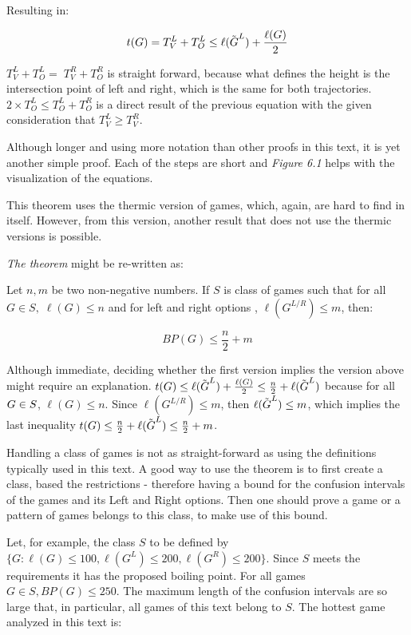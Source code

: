 Resulting in:

$$
t(G) = T^L_V + T^L_O \leq \ell(\tilde{\mbox{$G$}}^L) + \frac{\ell(G)}{2}
$$

$T^L_V + T^L_O =\;T^R_V+T^R_O$ is straight forward, because what defines the height is the intersection point of left and right, which is the same for both trajectories. $2\times T^L_O \leq T^L_O + T^R_O$ is a direct result of the previous equation with the given consideration that $T^L_V \ge T^R_V$. 

Although longer and using more notation than other proofs in this text, it is yet another simple proof. Each of the steps are short and \textit{Figure 6.1} helps with the visualization of the equations.

This theorem uses the thermic version of games, which, again, are hard to find in itself. However, from this version, another result that does not use the thermic versions is possible.

\textit{The theorem} might be re-written as:

Let $n, m$ be two non-negative numbers. If $S$ is class of games such that for all $G \in S,\;\ell(G) \leq n$ and for left and right options , $\ell(G^{L/R}) \leq m$, then:

$$
BP(G) \leq \frac{n}{2} + m
$$

Although immediate, deciding whether the first version implies the version above might require an explanation. $t(G) \leq \ell(\tilde{\mbox{$G$}}^L) + \frac{\ell(G)}{2} \leq \frac{n}{2} + \ell(\tilde{\mbox{$G$}}^L)$ because for all \mbox{$\mbox{$G$} \in S$}, \mbox{$\ell(G) \leq n$}. Since $\ell(G^{L/R}) \leq m$, then $\ell(\tilde{\mbox{$G$}}^L) \leq m$, which implies the last inequality \mbox{$t(G) \leq \frac{n}{2} + \ell(\tilde{\mbox{$G$}}^L) \leq \frac{n}{2} + m$}.

Handling a class of games is not as straight-forward as using the definitions typically used in this text. A good way to use the theorem is to first create a class, based the restrictions - therefore having a bound for the confusion intervals of the games and its Left and Right options. Then one should prove a game or a pattern of games belongs to this class, to make use of this bound.

Let, for example, the class $S$ to be defined by $\{G : \ell(G)\leq100, \ell(G^L)\leq200, \ell(G^R)\leq200\}$. Since $S$ meets the requirements it has the proposed boiling point. For all games $G \in S, BP(G) \leq 250$. The maximum length of the confusion intervals are so large that, in particular, all games of this text belong to $S$. The hottest game \Gm{} analyzed in this text is:

